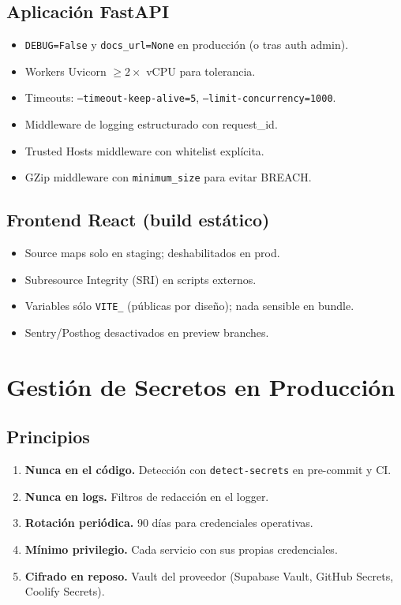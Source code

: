 \documentclass[12pt,a4paper,oneside]{article}
\begin{document}
\subsection{Aplicación FastAPI}

\begin{itemize}[leftmargin=*]
  \item \texttt{DEBUG=False} y \texttt{docs\_url=None} en producción (o tras auth admin).
  \item Workers Uvicorn $\geq 2 \times$ vCPU para tolerancia.
  \item Timeouts: \texttt{--timeout-keep-alive=5}, \texttt{--limit-concurrency=1000}.
  \item Middleware de logging estructurado con request\_id.
  \item Trusted Hosts middleware con whitelist explícita.
  \item GZip middleware con \texttt{minimum\_size} para evitar BREACH.
\end{itemize}

\subsection{Frontend React (build estático)}

\begin{itemize}[leftmargin=*]
  \item Source maps solo en staging; deshabilitados en prod.
  \item Subresource Integrity (SRI) en scripts externos.
  \item Variables sólo \texttt{VITE\_} (públicas por diseño); nada sensible en bundle.
  \item Sentry/Posthog desactivados en preview branches.
\end{itemize}

\section{Gestión de Secretos en Producción}

\subsection{Principios}

\begin{enumerate}[leftmargin=*]
  \item \textbf{Nunca en el código.} Detección con \texttt{detect-secrets} en pre-commit y CI.
  \item \textbf{Nunca en logs.} Filtros de redacción en el logger.
  \item \textbf{Rotación periódica.} 90 días para credenciales operativas.
  \item \textbf{Mínimo privilegio.} Cada servicio con sus propias credenciales.
  \item \textbf{Cifrado en reposo.} Vault del proveedor (Supabase Vault, GitHub Secrets, Coolify Secrets).
\end{enumerate}
\end{document}
